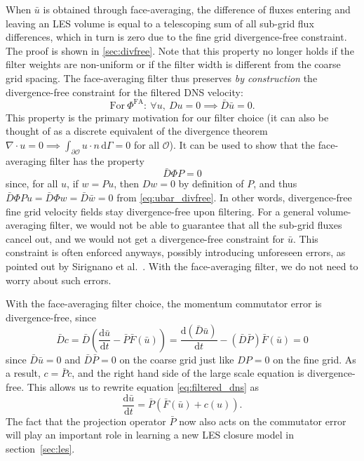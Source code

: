 \documentclass[preprint]{elsarticle}
\newcommand{\R}[1]{}
\newcommand{\revone}[1]{#1}
\newcommand{\revboth}[1]{#1}
\begin{document}
When $\bar{u}$ is obtained through face-averaging, the difference of fluxes
entering and leaving an LES volume is equal to a telescoping sum of all sub-grid
flux differences, which in turn is zero due to the fine grid divergence-free
constraint. The proof is shown in \ref{sec:divfree}. Note that this property no
longer holds if the \revboth{filter} weights are non-uniform or if the
\revboth{filter} width is different from the coarse grid spacing.
\R{novel5} \revone{ The} face-averaging filter
thus preserves \emph{by construction} the divergence-free constraint for the
filtered DNS velocity:
\begin{equation} \label{eq:ubar_divfree}
    \text{For} \ \Phi^\text{FA}: \ \boxed{\forall u, \ D u = 0 \implies \bar{D}
    \bar{u} = 0.}
\end{equation}
This property is the primary motivation for our filter choice (it can also be
thought of as a discrete equivalent of the divergence theorem $\nabla \cdot u =
0 \implies \int_{\partial \mathcal{O}} u \cdot n \, \mathrm{d} \Gamma = 0$ for
all $\mathcal{O}$). It can be used to show that the face-averaging filter has
the property
\begin{equation} \label{eq:DPhiP}
    \bar{D} \Phi P = 0
\end{equation}
since, for all $u$, if $w = P u$, then $D w = 0$ by definition
of $P$, and thus $\bar{D} \Phi P u = \bar{D} \Phi w = \bar{D} \bar{w} = 0$ from
\eqref{eq:ubar_divfree}.
In other words, divergence-free fine grid velocity fields stay divergence-free
upon filtering. For a general volume-averaging filter, we would not be able to
guarantee that all the sub-grid fluxes cancel out, and we would not get a
divergence-free constraint for $\bar{u}$. This constraint is often enforced
anyways, possibly introducing unforeseen errors, as pointed out by Sirignano et
al.~\cite{Sirignano2020}. With the face-averaging filter, we do not need to
worry about such errors.

With \revone{ the} face-averaging filter choice, the momentum
commutator error is divergence-free, since
\begin{equation}
    \bar{D} c = \bar{D} \left( \frac{\mathrm{d} \bar{u}}{\mathrm{d} t} - \bar{P}
    \bar{F}(\bar{u}) \right) = \frac{\mathrm{d} (\bar{D} \bar{u})}{\mathrm{d} t}
    - (\bar{D} \bar{P}) \bar{F}(\bar{u}) = 0
\end{equation}
since $\bar{D} \bar{u} = 0$ and $\bar{D} \bar{P} = 0$ on the coarse grid just
like $D P = 0$ on the fine grid.
As a result, $c = \bar{P} c$, and the right hand side of the large scale
equation is divergence-free. This allows us to rewrite equation
\eqref{eq:filtered_dns} as
\begin{equation} \label{eq:filtered_dns_divfree}
    \boxed{\frac{\mathrm{d} \bar{u}}{\mathrm{d} t} =
    \bar{P} \left( \bar{F}(\bar{u}) + c(u) \right).}
\end{equation}
The fact that the projection operator $\bar{P}$ now also acts on the commutator
error will play an important role in learning a new LES closure model in
section~\ref{sec:les}.
\end{document}
